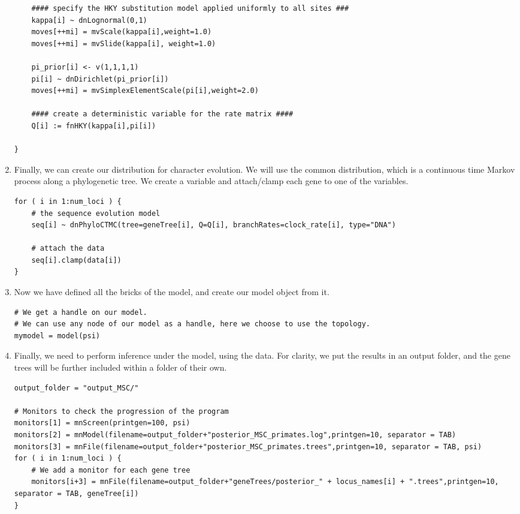 \begin{enumerate}
{\begin{snugshade*}
\begin{lstlisting}
    #### specify the HKY substitution model applied uniformly to all sites ###
    kappa[i] ~ dnLognormal(0,1)
    moves[++mi] = mvScale(kappa[i],weight=1.0)
    moves[++mi] = mvSlide(kappa[i], weight=1.0)

    pi_prior[i] <- v(1,1,1,1)
    pi[i] ~ dnDirichlet(pi_prior[i])
    moves[++mi] = mvSimplexElementScale(pi[i],weight=2.0)

    #### create a deterministic variable for the rate matrix ####
    Q[i] := fnHKY(kappa[i],pi[i])

}

\end{lstlisting}
\end{snugshade*}}


\item Finally, we can create our distribution for character evolution.
We will use the common  distribution, which is a continuous time Markov process along a phylogenetic tree.
We create a  variable and attach/clamp each gene to one of the  variables.
{\tt \begin{snugshade*}
\begin{lstlisting}
for ( i in 1:num_loci ) {
    # the sequence evolution model
    seq[i] ~ dnPhyloCTMC(tree=geneTree[i], Q=Q[i], branchRates=clock_rate[i], type="DNA")

    # attach the data
    seq[i].clamp(data[i])
}
\end{lstlisting}
\end{snugshade*}}


\item Now we have defined all the bricks of the model, and create our model object from it.
{\tt \begin{snugshade*}
\begin{lstlisting}
# We get a handle on our model.
# We can use any node of our model as a handle, here we choose to use the topology.
mymodel = model(psi)
\end{lstlisting}
\end{snugshade*}}


\item Finally, we need to perform inference under the model, using the data.
For clarity, we put the results in an output folder, and the gene trees will be further included within a folder of their own.
{\tt \begin{snugshade*}
\begin{lstlisting}
output_folder = "output_MSC/"

# Monitors to check the progression of the program
monitors[1] = mnScreen(printgen=100, psi)
monitors[2] = mnModel(filename=output_folder+"posterior_MSC_primates.log",printgen=10, separator = TAB)
monitors[3] = mnFile(filename=output_folder+"posterior_MSC_primates.trees",printgen=10, separator = TAB, psi)
for ( i in 1:num_loci ) {
    # We add a monitor for each gene tree
    monitors[i+3] = mnFile(filename=output_folder+"geneTrees/posterior_" + locus_names[i] + ".trees",printgen=10, separator = TAB, geneTree[i])
}


\end{lstlisting}
\end{snugshade*}}
\end{enumerate}
